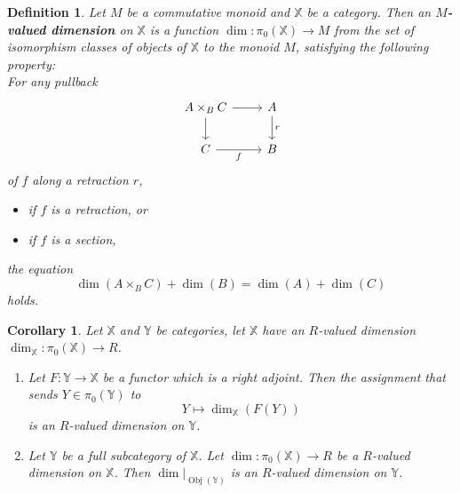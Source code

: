 \documentclass[10pt,a4paper]{amsart}
\newtheorem{definition}{Definition}
\newtheorem{corollary}{Corollary}
\newcommand{\Obj}{\ensuremath{\operatorname{Obj}}}
\begin{document}
\begin{definition}\label{def:monoid-valued-dimension}
    Let $M$ be a commutative monoid and $\mathbb X$ be a category. Then an \textbf{$M$-valued dimension} on $\mathbb X$ is a function $\dim : \pi_0(\mathbb X) \to M$ from the set of isomorphism classes of objects of $\mathbb X$ to the monoid $M$, satisfying the following property:\\
        For any pullback 
    \[\begin{tikzcd}
    	{A \times_B C} & A \\
    	C & B
    	\arrow[from=1-1, to=1-2]
    	\arrow[from=1-1, to=2-1]
    	\arrow["{r}", from=1-2, to=2-2]
    	\arrow["{f}"', from=2-1, to=2-2]
    \end{tikzcd}\]
        of $f$ along a retraction $r$,  
    \begin{itemize}
        \item if $f$ is a retraction, or
        \item if $f$ is a section,
    \end{itemize} the equation
        $$
        \dim(A \times_B C) + \dim(B) = \dim(A) + \dim(C)
        $$
        holds.
\end{definition}

\begin{corollary}\label{cor:adjunctions_full_subcats_and_dimensions}
    Let $\mathbb X$ and $\mathbb Y$ be categories, let $\mathbb X$ have an $R$-valued dimension $\dim_\mathbb X: \pi_0(\mathbb X) \to R$. 
    \begin{enumerate}[label = (\alph*)]
        \item Let $F: \mathbb Y \to \mathbb X$ be a functor which is a right adjoint. Then the assignment that sends $Y \in \pi_0(\mathbb Y)$ to
    $$
    Y \mapsto \dim_\mathbb X(F(Y))
    $$
    is an $R$-valued dimension on $\mathbb Y$.
    \item     Let $\mathbb Y$ be a full subcategory of $\mathbb X$. Let $\dim:  \pi_0(\mathbb X) \to R$ be a $R$-valued dimension on $\mathbb X$. Then $\dim|_{\Obj(\mathbb Y)}$ is an $R$-valued dimension on $\mathbb Y$.
    \end{enumerate}
\end{corollary}
\end{document}
